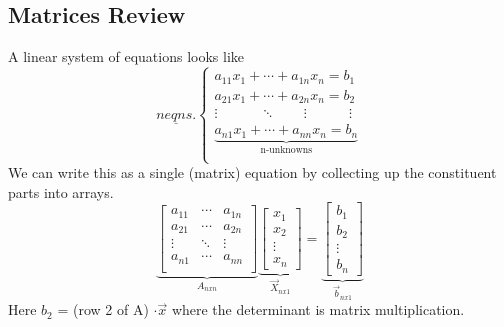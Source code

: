 \subsection*{Matrices Review}
A linear system of equations looks like
\begin{equation*}
	\underline{n eqns.}
	\begin{cases}
		a_{11}x_1 + \cdots + a_{1n}x_n = b_1\\
		a_{21}x_1 + \cdots + a_{2n}x_n = b_2\\
		\vdots \quad \quad \quad \ddots \quad \quad \vdots \quad \quad \quad  \vdots\\
		\underbrace{a_{n1}x_1 + \cdots + a_{nn}x_n = b_n}_{\text{n-unknowns}}\\
	\end{cases}
\end{equation*}
We can write this as a single (matrix) equation by collecting up the constituent parts into arrays.
\begin{equation*}
	\underbrace{\begin{bmatrix}
		a_{11} & \cdots & a_{1n}\\
		a_{21} & \cdots & a_{2n}\\
		\vdots & \ddots & \vdots\\
		a_{n1} & \cdots & a_{nn}\\
	\end{bmatrix}}_{A_{nxn}}
	\underbrace{\begin{bmatrix}
		x_1\\
		x_2\\
		\vdots\\
		x_n		
	\end{bmatrix}}_{\vec{X}_{nx1}}
	=
	\underbrace{\begin{bmatrix}
		b_1\\
		b_2\\
		\vdots\\
		b_n		
	\end{bmatrix}}_{\vec{b}_{nx1}}
\end{equation*}
Here $b_2$ = (row 2 of A) $\cdot  \vec{x}$ where the determinant is matrix multiplication.
